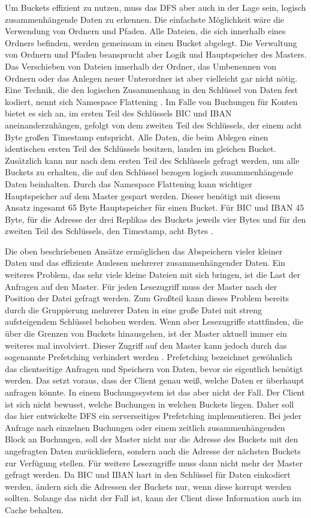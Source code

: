 \documentclass[12pt,oneside,a4paper,parskip]{scrbook}
\begin{document}
Um Buckets effizient zu nutzen, muss das DFS aber auch in der Lage sein, logisch zusammenhängende Daten zu erkennen. Die einfachste Möglichkeit wäre die Verwendung von Ordnern und Pfaden. Alle Dateien, die sich innerhalb eines Ordners befinden, werden gemeinsam in einen Bucket abgelegt. Die Verwaltung von Ordnern und Pfaden beansprucht aber Logik und Hauptspeicher des Masters. Das Verschieben von Dateien innerhalb der Ordner, das Umbenennen von Ordnern oder das Anlegen neuer Unterordner ist aber vielleicht gar nicht nötig. Eine Technik, die den logischen Zusammenhang in den Schlüssel von Daten fest kodiert, nennt sich Namespace Flattening \cite{smallfilesObjectStorage}. Im Falle von Buchungen für Konten bietet es sich an, im ersten Teil des Schlüssels BIC und IBAN aneinanderzuhängen, gefolgt von dem zweiten Teil des Schlüssels, der einem acht Byte großen Timestamp entspricht. Alle Daten, die beim Ablegen einen identischen ersten Teil des Schlüssels besitzen, landen im gleichen Bucket. Zusätzlich kann nur nach dem ersten Teil des Schlüssels gefragt werden, um alle Buckets zu erhalten, die auf den Schlüssel bezogen logisch zusammenhängende Daten beinhalten. Durch das Namespace Flattening kann wichtiger Hauptspeicher auf dem Master gespart werden. Dieser benötigt mit diesem Ansatz ingesamt 65 Byte Hauptspeicher für einen Bucket. Für BIC und IBAN 45 Byte, für die Adresse der drei Replikas des Buckets jeweils vier Bytes und für den zweiten Teil des Schlüssels, den Timestamp, acht Bytes \cite{bic}\cite{iban}.

Die oben beschriebenen Ansätze ermöglichen das Abspeichern vieler kleiner Daten und das effiziente Auslesen mehrerer zusammenhängender Daten. Ein weiteres Problem, das sehr viele kleine Dateien mit sich bringen, ist die Last der Anfragen auf den Master. Für jeden Lesezugriff muss der Master nach der Position der Datei gefragt werden. Zum Großteil kann dieses Problem bereits durch die Gruppierung mehrerer Daten in eine große Datei mit streng aufsteigendem Schlüssel behoben werden. Wenn aber Lesezugriffe stattfinden, die über die Grenzen von Buckets hinausgehen, ist der Master aktuell immer ein weiteres mal involviert. Dieser Zugriff auf den Master kann jedoch durch das sogenannte Prefetching verhindert werden \cite{smallfilesObjectStorage} \cite{smallFilePrefetching}. Prefetching bezeichnet gewöhnlich das clientseitige Anfragen und Speichern von Daten, bevor sie eigentlich benötigt werden. Das setzt voraus, dass der Client genau weiß, welche Daten er überhaupt anfragen könnte. In einem Buchungssystem ist das aber nicht der Fall. Der Client ist sich nicht bewusst, welche Buchungen in welchen Buckets liegen. Daher soll das hier entwickelte DFS ein serverseitiges Prefetching implementieren. Bei jeder Anfrage nach einzelnen Buchungen oder einem zeitlich zusammenhängenden Block an Buchungen, soll der Master nicht nur die Adresse des Buckets mit den angefragten Daten zurückliefern, sondern auch die Adresse der nächsten Buckets zur Verfügung stellen. Für weitere Lesezugriffe muss dann nicht mehr der Master gefragt werden. Da BIC und IBAN hart in den Schlüssel für Daten einkodiert werden, ändern sich die Adressen der Buckets nur, wenn diese korrupt werden sollten. Solange das nicht der Fall ist, kann der Client diese Information auch im Cache behalten.
\end{document}
